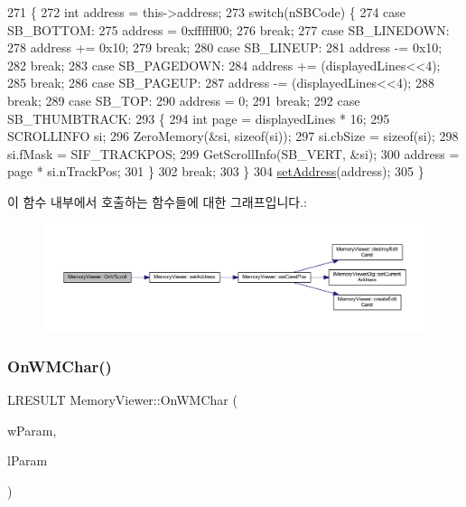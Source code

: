 \begin{DoxyCode}
271 \{
272   \textcolor{keywordtype}{int} address = this->address;
273   \textcolor{keywordflow}{switch}(nSBCode) \{
274   \textcolor{keywordflow}{case} SB\_BOTTOM:
275     address = 0xffffff00;
276     \textcolor{keywordflow}{break};
277   \textcolor{keywordflow}{case} SB\_LINEDOWN:
278     address += 0x10;
279     \textcolor{keywordflow}{break};
280   \textcolor{keywordflow}{case} SB\_LINEUP:
281     address -= 0x10;
282     \textcolor{keywordflow}{break};
283   \textcolor{keywordflow}{case} SB\_PAGEDOWN:
284     address += (displayedLines<<4);
285     \textcolor{keywordflow}{break};
286   \textcolor{keywordflow}{case} SB\_PAGEUP:
287     address -= (displayedLines<<4);
288     \textcolor{keywordflow}{break};
289   \textcolor{keywordflow}{case} SB\_TOP:
290     address = 0;
291     \textcolor{keywordflow}{break};
292   \textcolor{keywordflow}{case} SB\_THUMBTRACK:
293     \{
294       \textcolor{keywordtype}{int} page = displayedLines * 16;      
295       SCROLLINFO si;
296       ZeroMemory(&si, \textcolor{keyword}{sizeof}(si));
297       si.cbSize = \textcolor{keyword}{sizeof}(si);
298       si.fMask = SIF\_TRACKPOS;
299       GetScrollInfo(SB\_VERT, &si);
300       address = page * si.nTrackPos;
301     \}
302     \textcolor{keywordflow}{break};
303   \}
304   \mbox{\hyperlink{class_memory_viewer_abe391051455e116889da0613c19888a2}{setAddress}}(address);
305 \}
\end{DoxyCode}
이 함수 내부에서 호출하는 함수들에 대한 그래프입니다.\+:
\nopagebreak
\begin{figure}[H]
\begin{center}
\leavevmode
\includegraphics[width=350pt]{class_memory_viewer_ab371c01b5cc7069561f448e46e7d44a4_cgraph}
\end{center}
\end{figure}
\mbox{\label{class_memory_viewer_a47fb6730b742faedeafbb622e008317e}} 
\subsubsection{\texorpdfstring{On\+W\+M\+Char()}{OnWMChar()}}
{\footnotesize\ttfamily L\+R\+E\+S\+U\+LT Memory\+Viewer\+::\+On\+W\+M\+Char (\begin{DoxyParamCaption}\item[{W\+P\+A\+R\+AM}]{w\+Param,  }\item[{L\+P\+A\+R\+AM}]{l\+Param }\end{DoxyParamCaption})\hspace{0.3cm}{\ttfamily [protected]}}



